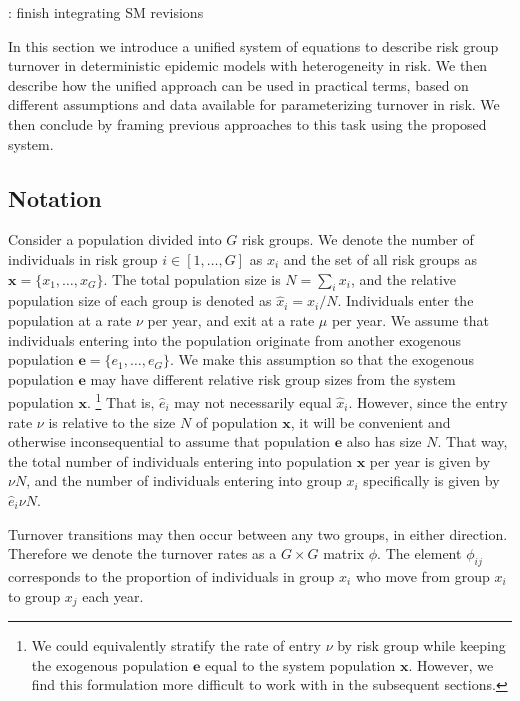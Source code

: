 : finish integrating SM revisions
\par
\color{gray}
In this section we introduce a unified system of equations
to describe risk group turnover
in deterministic epidemic models with heterogeneity in risk.
We then describe how the unified approach can be used in practical terms,
based on different assumptions and data available for parameterizing turnover in risk.
We then conclude by framing previous approaches to this task using the proposed system.
\subsection{Notation}
Consider a population divided into $G$ risk groups.
We denote the number of individuals in risk group $i \in [1, \dots, G]$ as $x_i$
and the set of all risk groups as $\bm{x} = \{x_1, \dots, x_G\}$.
The total population size is $N = \sum_i {x_i}$,
and the relative population size of each group
is denoted as $\hat{x}_i = x_i / N$.
Individuals enter the population at a rate $\nu$ per year,
and exit at a rate $\mu$ per year.
We assume that individuals entering into the population
originate from another exogenous population
$\bm{e} = \{e_1, \dots, e_G\}$.
We make this assumption so that the exogenous population $\bm{e}$
may have different relative risk group sizes from the system population $\bm{x}$.%
\footnote{We could equivalently stratify the rate of entry $\nu$ by risk group
  while keeping the exogenous population $\bm{e}$
  equal to the system population $\bm{x}$.
  However, we find this formulation more difficult to work with
  in the subsequent sections.}
That is, $\hat{e}_i$ may not necessarily equal $\hat{x}_i$.
However, since the entry rate $\nu$ is relative to the size $N$ of population $\bm{x}$,
it will be convenient and otherwise inconsequential to assume that population $\bm{e}$
also has size $N$.
That way, the total number of individuals
entering into population $\bm{x}$ per year is given by $\nu N$,
and the number of individuals
entering into group $x_i$ specifically is given by $\hat{e}_i \nu N$.
\par
Turnover transitions may then occur between any two groups, in either direction.
Therefore we denote the turnover rates as a $G \times G$ matrix $\phi$.
The element $\phi_{ij}$ corresponds to the proportion of individuals in group $x_i$
who move from group $x_i$ to group $x_j$ each year.
